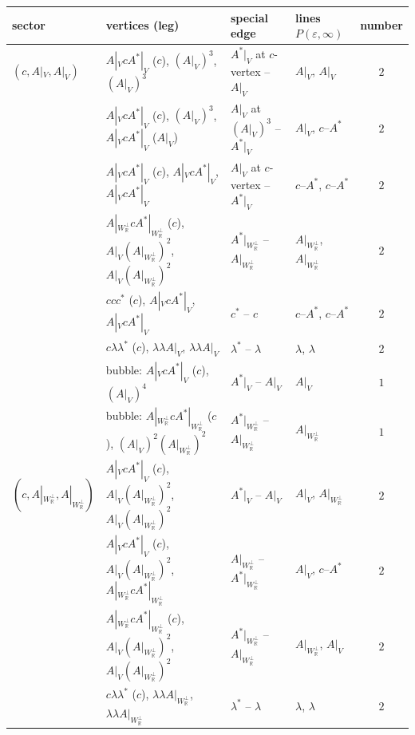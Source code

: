\begin{tabular}{l|l|l|l|c}
sector & vertices (leg) & special edge & lines $P(\varepsilon,\infty)$ & number \\
\hline
$(c,A|_V,A|_V)$ & $A|_VcA^*|_V$ ($c$), $(A|_V)^3$, $(A|_V)^3$ & $A^*|_V$ at $c$-vertex -- $A|_V$ & $A|_V$, $A|_V$ & $2$ \\
 & $A|_VcA^*|_V$ ($c$), $(A|_V)^3$, $A|_VcA^*|_V$ ($A|_V$) & $A|_V$ at $(A|_V)^3$ -- $A^*|_V$ & $A|_V$, $c$--$A^*$ & $2$ \\
 & $A|_VcA^*|_V$ ($c$), $A|_VcA^*|_V$, $A|_VcA^*|_V$ & $A|_V$ at $c$-vertex -- $A^*|_V$ & $c$--$A^*$, $c$--$A^*$ & $2$ \\
 & $A|_{W_{\mathbb R}^\perp}cA^*|_{W_{\mathbb R}^\perp}$ ($c$), $A|_V(A|_{W_{\mathbb R}^\perp})^2$, $A|_V(A|_{W_{\mathbb R}^\perp})^2$ & $A^*|_{W_{\mathbb R}^\perp}$ -- $A|_{W_{\mathbb R}^\perp}$ & $A|_{W_{\mathbb R}^\perp}$, $A|_{W_{\mathbb R}^\perp}$ & $2$ \\
 & $ccc^*$ ($c$), $A|_VcA^*|_V$, $A|_VcA^*|_V$ & $c^*$ -- $c$ & $c$--$A^*$, $c$--$A^*$ & $2$ \\
 & $c\lambda\lambda^*$ ($c$), $\lambda\lambda A|_V$, $\lambda\lambda A|_V$ & $\lambda^*$ -- $\lambda$ & $\lambda$, $\lambda$ & $2$ \\
 & bubble: $A|_VcA^*|_V$ ($c$), $(A|_V)^4$ & $A^*|_V$ -- $A|_V$ & $A|_V$ & $1$ \\
 & bubble: $A|_{W_{\mathbb R}^\perp}cA^*|_{W_{\mathbb R}^\perp}$ ($c$), $(A|_V)^2(A|_{W_{\mathbb R}^\perp})^2$ & $A^*|_{W_{\mathbb R}^\perp}$ -- $A|_{W_{\mathbb R}^\perp}$ & $A|_{W_{\mathbb R}^\perp}$ & $1$ \\
\hline
$(c,A|_{W_{\mathbb R}^\perp},A|_{W_{\mathbb R}^\perp})$ & $A|_VcA^*|_V$ ($c$), $A|_V(A|_{W_{\mathbb R}^\perp})^2$, $A|_V(A|_{W_{\mathbb R}^\perp})^2$ & $A^*|_V$ -- $A|_V$ & $A|_V$, $A|_{W_{\mathbb R}^\perp}$ & $2$ \\
 & $A|_VcA^*|_V$ ($c$), $A|_V(A|_{W_{\mathbb R}^\perp})^2$, $A|_{W_{\mathbb R}^\perp}cA^*|_{W_{\mathbb R}^\perp}$ & $A|_{W_{\mathbb R}^\perp}$ -- $A^*|_{W_{\mathbb R}^\perp}$ & $A|_V$, $c$--$A^*$ & $2$ \\
 & $A|_{W_{\mathbb R}^\perp}cA^*|_{W_{\mathbb R}^\perp}$ ($c$), $A|_V(A|_{W_{\mathbb R}^\perp})^2$, $A|_V(A|_{W_{\mathbb R}^\perp})^2$ & $A^*|_{W_{\mathbb R}^\perp}$ -- $A|_{W_{\mathbb R}^\perp}$ & $A|_{W_{\mathbb R}^\perp}$, $A|_V$ & $2$ \\
 & $c\lambda\lambda^*$ ($c$), $\lambda\lambda A|_{W_{\mathbb R}^\perp}$, $\lambda\lambda A|_{W_{\mathbb R}^\perp}$ & $\lambda^*$ -- $\lambda$ & $\lambda$, $\lambda$ & $2$ \\

\end{tabular}
